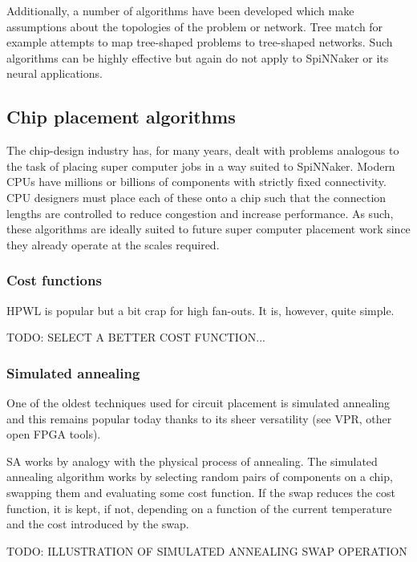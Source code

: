 				Additionally, a number of algorithms have been developed which make
				assumptions about the topologies of the problem or network. Tree match
				for example attempts to map tree-shaped problems to tree-shaped
				networks. Such algorithms can be highly effective but again do not
				apply to SpiNNaker or its neural applications.
		
		\subsection{Chip placement algorithms}
			
			The chip-design industry has, for many years, dealt with problems
			analogous to the task of placing super computer jobs in a way suited to
			SpiNNaker. Modern CPUs have millions or billions of components with
			strictly fixed connectivity. CPU designers must place each of these onto
			a chip such that the connection lengths are controlled to reduce
			congestion and increase performance. As such, these algorithms are
			ideally suited to future super computer placement work since they already
			operate at the scales required.
			
			\subsubsection{Cost functions}
				
				HPWL is popular but a bit crap for high fan-outs. It is, however, quite
				simple.
				
				TODO: SELECT A BETTER COST FUNCTION...
			
			\subsubsection{Simulated annealing}
				
				One of the oldest techniques used for circuit placement is simulated
				annealing and this remains popular today thanks to its sheer
				versatility (see VPR, other open FPGA tools).
				
				SA works by analogy with the physical process of annealing.
				The simulated annealing algorithm works by selecting random pairs of
				components on a chip, swapping them and evaluating some cost function.
				If the swap reduces the cost function, it is kept, if not, depending on
				a function of the current temperature and the cost introduced by the
				swap.
				
				TODO: ILLUSTRATION OF SIMULATED ANNEALING SWAP OPERATION
				

